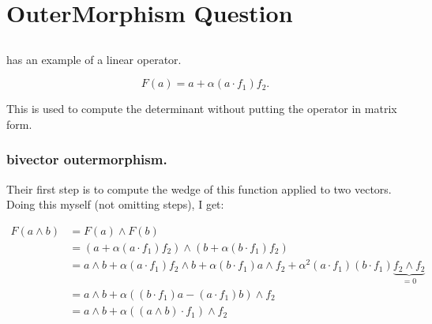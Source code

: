 
%
\chapter{OuterMorphism Question }
\label{chap:outermorphismDet}
\date{ Sept. 2, 2008.  $RCSfile: outermorphismDet.tex,v $ Last $Revision: 1.11 $ $Date: 2009/06/14 17:59:59 $ }

%


\section{ }

\cite{doran2003gap}
has an example of a linear operator.

\begin{equation}\label{eqn:outermorphism_det:F}
F(a) = a + \alpha(a \cdot f_1) f_2. 
\end{equation} 

This is used to compute the determinant without putting the operator 
in matrix form.

\subsection{bivector outermorphism. }

Their first step is to compute the wedge of this function applied to two vectors.  Doing this myself (not omitting steps), I get:

\begin{align*} 
F(a \wedge b) 
&= F(a) \wedge F(b) \\
&= (a + \alpha(a \cdot f_1) f_2 ) \wedge (b + \alpha(b \cdot f_1) f_2 ) \\
&= a \wedge b + \alpha(a \cdot f_1) f_2 \wedge b
+ \alpha (b \cdot f_1) a \wedge f_2 
+ \alpha^2 (a \cdot f_1) (b \cdot f_1) \underbrace{f_2 \wedge f_2}_{=0} \\
&= a \wedge b 
+ \alpha \left( (b \cdot f_1) a - (a \cdot f_1) b \right) \wedge f_2  
\\
&= a \wedge b 
+ \alpha \left( (a \wedge b ) \cdot f_1 \right) \wedge f_2  
\end{align*} 

